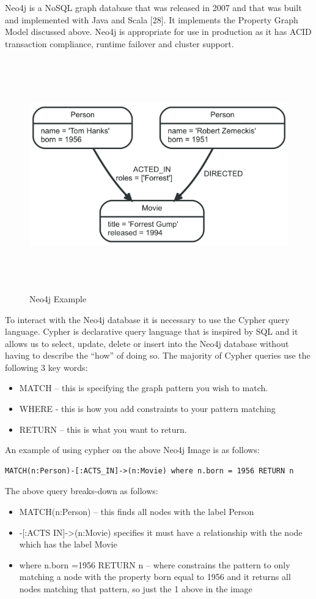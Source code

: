 Neo4j is a NoSQL graph database that was released in 2007 and that was built and implemented with Java and Scala [28]. It implements the Property Graph Model discussed above. Neo4j is appropriate for use in production as it has ACID transaction compliance, runtime failover and cluster support.

\begin{figure}[h]
	\caption{Neo4j Example}
	\centering
	\includegraphics[width=15cm, height=10cm]{img/neo4j-example}
\end{figure}

To interact with the Neo4j database it is necessary to use the Cypher query language. Cypher is declarative query language that is inspired by SQL and it allows us to select, update, delete or insert into the Neo4j database without having to describe the “how” of doing so. The majority of Cypher queries use the following 3 key words:
\begin{itemize}
	\item MATCH – this is specifying the graph pattern you wish to match.
	\item WHERE -  this is how you add constraints to your pattern matching 
	\item RETURN – this is what you want to return.
\end{itemize}
An example of using cypher on the above Neo4j Image is as follows:
\begin{verbatim}
MATCH(n:Person)-[:ACTS_IN]->(n:Movie) where n.born = 1956 RETURN n
\end{verbatim}
The above query breaks-down as follows:
\begin{itemize}
	\item MATCH(n:Person) – this finds all nodes with the label Person
	\item -[:ACTS IN]->(n:Movie) specifies it must have a relationship with the node which has the label Movie
	\item where n.born =1956 RETURN n – where constrains the pattern to only matching a node with the property born equal to 1956 and it returns all nodes matching that pattern, so just the 1 above in the image \cite{neo4j}
\end{itemize}
